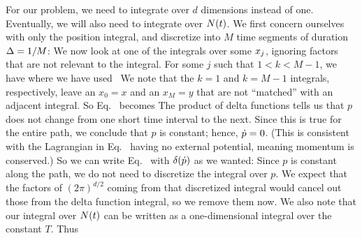 {	For our problem, we need to integrate over $d$ dimensions instead of one.  Eventually, we will also need to integrate over $N(t)$.  We first concern ourselves with only the position integral, and discretize into $M$ time segments of duration $\Delta = 1 / M$:
	We now look at one of the integrals over some $x_j$, ignoring factors that are not relevant to the integral.  For some $j$ such that $1 < k < M - 1$, we have
	where we have used~\cite{Delta}
	We note that the $k = 1$ and $k = M - 1$ integrals, respectively, leave an $x_0 = x$ and an $x_M = y$ that are not ``matched'' with an adjacent integral.  So Eq.~ becomes
	The product of delta functions tells us that $p$ does not change from one short time interval to the next.  Since this is true for the entire path, we conclude that $p$ is constant; hence, $\dot{p} = 0$.  (This is consistent with the Lagrangian in Eq.~ having no external potential, meaning momentum is conserved.)  So we can write Eq.~ with $\delta(\dot{p})$ as we wanted:
	Since $p$ is constant along the path, we do not need to discretize the integral over $p$.  We expect that the factors of $(2\pi)^{d / 2}$ coming from that discretized integral would cancel out those from the delta function integral, so we remove them now.  We also note that our integral over $N(t)$ can be written as a one-dimensional integral over the constant $T$.  Thus
	}
